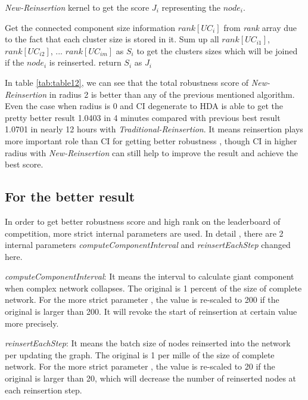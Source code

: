 \documentclass{article}
\begin{document}
	\begin{algorithm}[!htbp]
		\caption{ \textit{New-Reinsertion} kernel to get the score $J_i$ representing the $node_i$. }
		\label{algo:algo5}
		\begin{algorithmic}[1]
			\State Get the connected component size information $rank[UC_{i}]$ from \textit{rank} array due to the fact that each cluster size is stored in it. Sum up all $rank[UC_{i1}]$, $rank[UC_{i2}]$, ... $rank[UC_{im}]$ as $S_i$ to get the clusters sizes which will be joined if the $node_i$ is reinserted.
			\State return $S_i$ as $J_i$ 
		\end{algorithmic}
	\end{algorithm}	

	
	
	
	 In table \ref{tab:table12}, we can see that the total robustness score of \textit{New-Reinsertion} in radius 2 is better than any of the previous mentioned algorithm. Even the case when radius is 0 and CI degenerate to HDA is able to get the pretty better result 1.0403 in 4 minutes compared with previous best result 1.0701 in nearly 12 hours with \textit{Traditional-Reinsertion}. It means reinsertion plays more important role than CI for getting better robustness , though CI in higher radius with \textit{New-Reinsertion} can still help to improve the result and achieve the best score.
	 
	 
	 
	\subsection{For the better result}
	 

	In order to get better robustness score and high rank on the leaderboard of competition, more strict internal parameters are used. In detail , there are 2 internal parameters \textit{computeComponentInterval} and \textit{reinsertEachStep} changed here.
		
	\begin{enumerate}
		\begin{item}
			\textit{computeComponentInterval}: It means the interval to calculate giant component when complex network collapses. The original is 1 percent of the size of complete network. For the more strict parameter , the value is re-scaled to 200 if the original is larger than 200. It will revoke the start of reinsertion at certain value more precisely.
		\end{item}
		\begin{item}
			\textit{reinsertEachStep}: It means the batch size of nodes reinserted into the network per updating the graph. The original is 1 per mille of the size of complete network. For the more strict parameter , the value is re-scaled to 20 if the original is larger than 20, which will decrease the number of reinserted nodes at each reinsertion step.
		\end{item}		
		
	\end{enumerate}			
		
\end{document}
